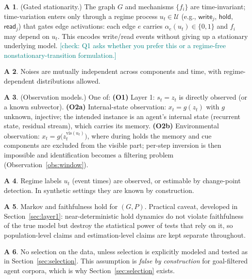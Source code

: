 \documentclass[11pt]{article}
\newcommand{\checkY}[1]{\textcolor{teal}{\footnotesize [check: #1]}}
\theoremstyle{plain}
\theoremstyle{definition}
\newtheorem{assumption}{A}
\begin{document}
\begin{assumption}\label{a:gated}
(Gated stationarity.) The graph $G$ and mechanisms $\{f_i\}$ are time-invariant; time-variation enters only through a regime process $u_t \in \mathcal{U}$ (e.g., $\mathsf{write}_j$, $\mathsf{hold}$, $\mathsf{read}_j$) that gates edge activations: each edge $e$ carries $\alpha_e(u_t) \in \{0,1\}$ and $f_i$ may depend on $u_t$. This encodes write/read events without giving up a stationary underlying model. \checkY{Q1 asks whether you prefer this or a regime-free nonstationary-transition formulation.}
\end{assumption}

\begin{assumption}\label{a:noise}
Noises are mutually independent across components and time, with regime-dependent distributions allowed.
\end{assumption}

\begin{assumption}\label{a:obs}
(Observation models.) One of:
\textbf{(O1)} Layer 1: $s_t = z_t$ is directly observed (or a known subvector).
\textbf{(O2a)} Internal-state observation: $x_t = g(z_t)$ with $g$ unknown, injective; the intended instance is an agent's internal state (recurrent state, residual stream), which carries its memory.
\textbf{(O2b)} Environmental observation: $x_t = g\big(z_t^{\mathrm{vis}(u_t)}\big)$, where during holds the memory and cue components are excluded from the visible part; per-step inversion is then impossible and identification becomes a filtering problem (Observation~\ref{obs:window}).
\end{assumption}

\begin{assumption}\label{a:regime}
Regime labels $u_t$ (event times) are observed, or estimable by change-point detection. In synthetic settings they are known by construction.
\end{assumption}

\begin{assumption}\label{a:mf}
Markov and faithfulness hold for $(G, P)$. Practical caveat, developed in Section~\ref{sec:layer1}: near-deterministic hold dynamics do not violate faithfulness of the true model but destroy the statistical power of tests that rely on it, so population-level claims and estimation-level claims are kept separate throughout.
\end{assumption}

\begin{assumption}\label{a:nosel}
No selection on the data, unless selection is explicitly modeled and tested as in Section~\ref{sec:selection}. This assumption is \emph{false by construction} for goal-filtered agent corpora, which is why Section~\ref{sec:selection} exists.
\end{assumption}
\end{document}
